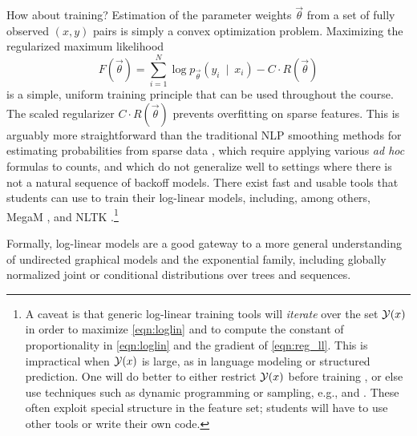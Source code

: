 \documentclass[11pt,letterpaper]{article}
\DeclareMathOperator*{\argmax}{arg\,max}
\begin{document}
How about training?  Estimation of the parameter weights
$\vec{\theta}$ from a set of fully observed $(x,y)$ pairs is simply a
convex optimization problem.  Maximizing the regularized maximum
likelihood
\begin{equation}\label{eqn:reg_ll}
  F\left(\vec{\theta}\right) = \sum_{i=1}^N \log{p_{\vec{\theta}}\left(y_i\ \mid\ x_i\right)} - C \cdot R\left(\vec{\theta}\right)
\end{equation}
is a simple, uniform training principle that can be used throughout
the course.  The scaled regularizer $C\cdot R(\vec{\theta})$
prevents overfitting on sparse features.
This is arguably more straightforward than the traditional NLP
smoothing methods for estimating probabilities from sparse data
\cite{chen-goodman-1996}, which require applying various {\em ad hoc}
formulas to counts, and which do not generalize well to settings where
there is not a natural sequence of backoff models.  There exist 
fast and usable tools that students can use to train their log-linear
models, including, among others, MegaM \cite{daume04cg-bfgs}, 
and NLTK \cite{bird2009natural}.\footnote{\label{fn:bigY}A caveat is that generic
  log-linear training tools will {\em iterate} over the set ${\cal
    Y}(x)$ in order to maximize
  \eqref{eqn:loglin} and to compute the constant of proportionality
  in \eqref{eqn:loglin} and the gradient of
  \eqref{eqn:reg_ll}.  This is impractical when ${\cal Y}(x)$ is large, as in
  language modeling or structured prediction.  One will do better to
 either restrict ${\cal Y}(x)$ before training
\cite{johnson-et-al-1999}, or else use techniques such as dynamic
programming or sampling, e.g., 
\cite{lafferty-mccallum-pereira-2001} and \cite{rosenfeld-chen-zhu-2001}. 
These often exploit special
structure in the feature set; students will have to use other tools or 
write their own code.}
%

Formally, log-linear models are a good gateway to a more general
understanding of undirected graphical models and the exponential
family, including globally normalized joint or conditional
distributions over trees and sequences.
\end{document}
